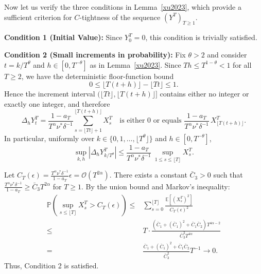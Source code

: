 \documentclass[letterpaper]{article}
\numberwithin{equation}{section}
\theoremstyle{definition}
\theoremstyle{remark}
\begin{document}
    {
    Now let us verify the three conditions in Lemma~\ref{xu2023}, which provide a sufficient criterion for $C$-tightness of the sequence $(Y^T)_{T\ge1}$.
    }
    \begin{enumerate}
        \item \textbf{Condition 1 (Initial Value):} Since $Y_0^T=0$, this condition is trivially satisfied.

        {
              \item \textbf{Condition 2 (Small increments in probability):}
              Fix $\theta>2$ and consider $t=k/T^\theta$ and $h\in[0,T^{-\theta}]$ as in Lemma~\ref{xu2023}.
              Since $Th\le T^{1-\theta}<1$ for all $T\ge2$, we have the deterministic floor-function bound
              \[
              {
              0\le \lfloor T(t+h)\rfloor-\lfloor Tt\rfloor \le 1.}
              \]
              {
              Hence the increment interval $(\lfloor Tt\rfloor,\lfloor T(t+h)\rfloor]$ contains either no integer or exactly one integer, and therefore}
              \[
              {
              \Delta_h Y_t^T
              = \frac{1-a_T}{T^\alpha \nu^*\delta^{-1}}
              \sum_{s=\lfloor Tt\rfloor+1}^{\lfloor T(t+h)\rfloor} X_s^T}
              \quad{\text{is either }0\text{ or equals } \frac{1-a_T}{T^\alpha \nu^*\delta^{-1}}\,X_{\lfloor T(t+h)\rfloor}^T.}
              \]
              {
              In particular, uniformly over $k\in\{0,1,\dots,\lfloor T^\theta\rfloor\}$ and $h\in[0,T^{-\theta}]$,}
              \[
              {
              \sup_{k,h}\left|\Delta_h Y_{k/T^\theta}^T\right|
              \le \frac{1-a_T}{T^\alpha \nu^*\delta^{-1}}\,
              \sup_{1\le s\le \lfloor T\rfloor} X_s^T.}
              \]
              }
              Let $C_T(\epsilon) = \frac{T^\alpha \nu^*\delta^{-1}}{1-a_T}\epsilon = \mathcal{O}(T^{2\alpha})$. There exists a constant $\bar C_3>0$ such that $\frac{T^\alpha \nu^*\delta^{-1}}{1-a_T} \ge \bar C_3T^{2\alpha}$ for $T\ge1$.
              By the union bound and Markov's inequality:
              \begin{align*}
                \mathbb P\left(\sup_{s \le \lfloor T \rfloor} X_s^T > C_T(\epsilon)\right) 
                \le &\sum_{s=0}^{\lfloor T \rfloor} \frac{\mathbb E[ (X_s^T)^2 ]}{C_T(\epsilon)^2} \\
                \le &T \cdot \frac{\left(\bar C_1+(\bar C_1)^2+\bar C_1\bar C_2\right) T^{4\alpha-2}}{\bar C_3^2T^{4\alpha}} \\
                = &\frac{\bar C_1+(\bar C_1)^2+\bar C_1\bar C_2}{\bar C_3^2}T^{-1} \to 0.
              \end{align*}
              Thus, Condition 2 is satisfied.


\end{enumerate}
\end{document}
